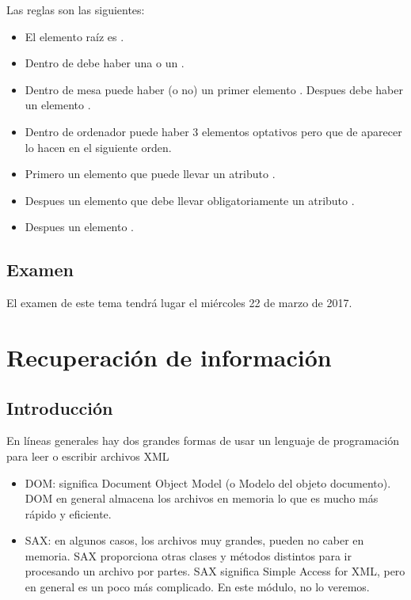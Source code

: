 \documentclass[letterpaper,10pt,spanish]{sphinxmanual}
\begin{document}
Las reglas son las siguientes:
\begin{itemize}
\item {} 
El elemento raíz es .

\item {} 
Dentro de  debe haber una  o un .

\item {} 
Dentro de mesa puede haber (o no) un primer elemento . Despues debe haber un elemento .

\item {} 
Dentro de ordenador puede haber 3 elementos optativos pero que de aparecer lo hacen en el siguiente orden.

\item {} 
Primero un elemento  que puede llevar un atributo .

\item {} 
Despues un elemento  que debe llevar obligatoriamente un atributo .

\item {} 
Despues un elemento .

\end{itemize}


\section{Examen}
\label{tema5:examen}
El examen de este tema tendrá lugar el miércoles 22 de marzo de 2017.


\chapter{Recuperación de información}
\label{tema6::doc}\label{tema6:recuperacion-de-informacion}

\section{Introducción}
\label{tema6:introduccion}
En líneas generales hay dos grandes formas de usar un lenguaje de programación para leer o escribir archivos XML
\begin{itemize}
\item {} 
DOM: significa Document Object Model (o Modelo del objeto documento). DOM en general almacena los archivos en memoria lo que es mucho más rápido y eficiente.

\item {} 
SAX: en algunos casos, los archivos muy grandes, pueden no caber en memoria. SAX proporciona otras clases y métodos distintos para ir procesando un archivo por partes. SAX significa Simple Access for XML, pero en general es un poco más complicado. En este módulo, no lo veremos.

\end{itemize}
\end{document}
